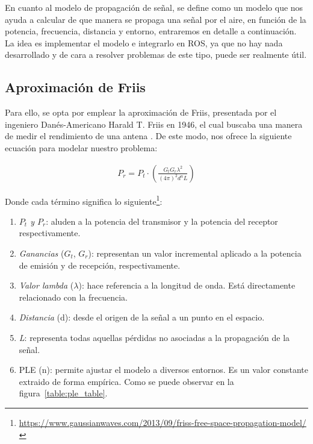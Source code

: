 En cuanto al modelo de propagación de señal, se define como un modelo que nos ayuda a calcular de que manera se propaga una señal por el aire, en función de la potencia, frecuencia, distancia y entorno, entraremos en detalle a continuación. La idea es implementar el modelo e integrarlo en \ac{ROS}, ya que no hay nada desarrollado y de cara a resolver problemas de este tipo, puede ser realmente útil.\\

\subsection{Aproximación de Friis}
\label{subsec:friis}

Para ello, se opta por emplear la aproximación de Friis, presentada por el ingeniero Danés-Americano Harald T. Friis en 1946, el cual buscaba una manera de medir el rendimiento de una antena \cite{johnson1984antenna}. De este modo, nos ofrece la siguiente ecuación para modelar nuestro problema:

\begin{align}
    P_r = P_t \cdot \left( \frac{G_t G_r \lambda^2 }{(4 \pi)^2 d^n L} \right)
\end{align}

Donde cada término significa lo siguiente\footnote[3]{\url{https://www.gaussianwaves.com/2013/09/friss-free-space-propagation-model/}}:

\begin{enumerate}
    \item \emph{$P_t$ y $P_r$}: aluden a la potencia del transmisor y la potencia del receptor respectivamente.
    \item \emph{Ganancias} ($G_t$, $G_r$): representan un valor incremental aplicado a la potencia de emisión y de recepción, respectivamente.
    \item \emph{Valor lambda} ($\lambda$): hace referencia a la longitud de onda. Está directamente relacionado con la frecuencia.
    \item \emph{Distancia} (d): desde el origen de la señal a un punto en el espacio.
    \item \emph{L}: representa todas aquellas pérdidas no asociadas a la propagación de la señal.
    \item \ac{PLE} (n): permite ajustar el modelo a diversos entornos. Es un valor constante extraido de forma empírica. Como se puede observar en la figura~\ref{table:ple_table}.
\end{enumerate}

